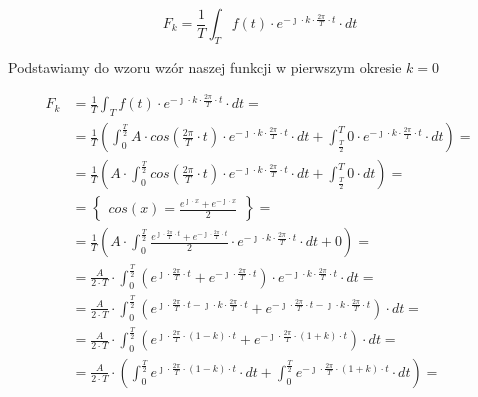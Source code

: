 \begin{task}
\begin{equation}
F_k=\frac{1}{T}\int_{T}f(t) \cdot e^{- \jmath \cdot k \cdot \frac{2\pi}{T} \cdot t} \cdot dt
\end{equation}

Podstawiamy do wzoru wzór naszej funkcji w pierwszym okresie $k=0$

\begin{align*}
F_k&=\frac{1}{T}\int_{T}f(t) \cdot e^{-\jmath \cdot k \cdot \frac{2\pi}{T} \cdot t} \cdot dt=\\
&=\frac{1}{T}\left( \int_{0}^{\frac{T}{2}}A \cdot cos\left( \frac{2\pi}{T} \cdot t\right) \cdot e^{ - \jmath \cdot k \cdot \frac{2\pi}{T} \cdot t} \cdot dt + \int_{\frac{T}{2}}^{T} 0 \cdot e^{ - \jmath \cdot k \cdot \frac{2\pi}{T} \cdot t} \cdot dt\right)=\\
&=\frac{1}{T}\left( A \cdot  \int_{0}^{\frac{T}{2}}cos\left( \frac{2\pi}{T} \cdot t\right) \cdot e^{ -\jmath \cdot k \cdot \frac{2\pi}{T} \cdot t} \cdot dt + \int_{\frac{T}{2}}^{T} 0 \cdot dt\right)=\\
&=\begin{Bmatrix}
cos\left(x\right) = \frac{e^{\jmath \cdot x}+e^{-\jmath \cdot x}}{2}
\end{Bmatrix}=\\
&=\frac{1}{T}\left( A \cdot  \int_{0}^{\frac{T}{2}} \frac{e^{\jmath \cdot \frac{2\pi}{T} \cdot t}+e^{-\jmath \cdot \frac{2\pi}{T} \cdot t}}{2} \cdot e^{ - \jmath \cdot k \cdot \frac{2\pi}{T} \cdot t} \cdot dt + 0\right)=\\
&=\frac{A}{2\cdot T}\cdot  \int_{0}^{\frac{T}{2}} \left(e^{\jmath \cdot \frac{2\pi}{T} \cdot t}+e^{-\jmath \cdot \frac{2\pi}{T} \cdot t}\right) \cdot e^{- \jmath \cdot k \cdot \frac{2\pi}{T} \cdot t} \cdot dt =\\
&=\frac{A}{2\cdot T}\cdot  \int_{0}^{\frac{T}{2}} \left(e^{\jmath \cdot \frac{2\pi}{T} \cdot t - \jmath \cdot k \cdot \frac{2\pi}{T} \cdot t}+e^{-\jmath \cdot \frac{2\pi}{T} \cdot t - \jmath \cdot k \cdot \frac{2\pi}{T} \cdot t}\right) \cdot dt =\\
&=\frac{A}{2\cdot T}\cdot  \int_{0}^{\frac{T}{2}} \left(e^{\jmath \cdot \frac{2\pi}{T} \cdot \left(1 -k\right) \cdot t}+e^{-\jmath \cdot \frac{2\pi}{T} \cdot \left(1+k\right)\cdot t }\right) \cdot dt =\\
&=\frac{A}{2\cdot T}\cdot \left( \int_{0}^{\frac{T}{2}} e^{\jmath \cdot \frac{2\pi}{T} \cdot \left(1 -k\right) \cdot t} \cdot dt + \int_{0}^{\frac{T}{2}} e^{-\jmath \cdot \frac{2\pi}{T} \cdot \left(1+k\right)\cdot t } \cdot dt \right)=\\

\end{align*}
\end{task}
